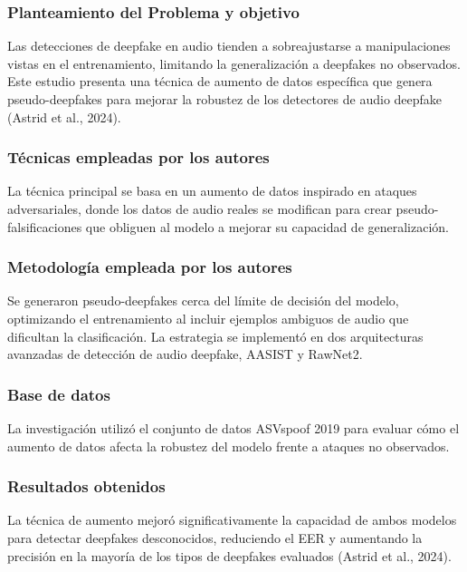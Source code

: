 \subsubsection{Planteamiento del Problema y objetivo }
Las detecciones de deepfake en audio tienden a sobreajustarse a manipulaciones vistas en el entrenamiento, limitando la generalización a deepfakes no observados. Este estudio presenta una técnica de aumento de datos específica que genera pseudo-deepfakes para mejorar la robustez de los detectores de audio deepfake (Astrid et al., 2024).

\subsubsection{Técnicas empleadas por los autores}
La técnica principal se basa en un aumento de datos inspirado en ataques adversariales, donde los datos de audio reales se modifican para crear pseudo-falsificaciones que obliguen al modelo a mejorar su capacidad de generalización.

\subsubsection{Metodología empleada por los autores}
Se generaron pseudo-deepfakes cerca del límite de decisión del modelo, optimizando el entrenamiento al incluir ejemplos ambiguos de audio que dificultan la clasificación. La estrategia se implementó en dos arquitecturas avanzadas de detección de audio deepfake, AASIST y RawNet2.

\subsubsection{Base de datos}
La investigación utilizó el conjunto de datos ASVspoof 2019 para evaluar cómo el aumento de datos afecta la robustez del modelo frente a ataques no observados.

\subsubsection{Resultados obtenidos}
La técnica de aumento mejoró significativamente la capacidad de ambos modelos para detectar deepfakes desconocidos, reduciendo el EER y aumentando la precisión en la mayoría de los tipos de deepfakes evaluados (Astrid et al., 2024).
